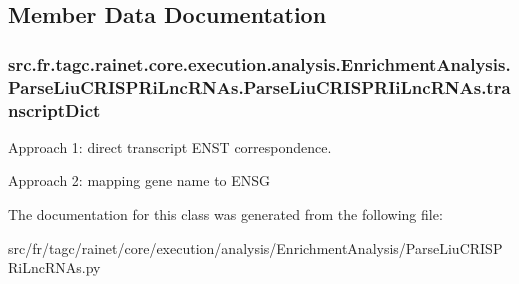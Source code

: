 \subsection{Member Data Documentation}
\hypertarget{classsrc_1_1fr_1_1tagc_1_1rainet_1_1core_1_1execution_1_1analysis_1_1EnrichmentAnalysis_1_1Parsee13b9e804847e1d3b2331cd039942e35_a77702ac784a00934adc3beff93714f3e}{
\subsubsection[{transcript\-Dict}]{\setlength{\rightskip}{0pt plus 5cm}src.\-fr.\-tagc.\-rainet.\-core.\-execution.\-analysis.\-Enrichment\-Analysis.\-Parse\-Liu\-C\-R\-I\-S\-P\-Ri\-Lnc\-R\-N\-As.\-Parse\-Liu\-C\-R\-I\-S\-P\-R\-Ii\-Lnc\-R\-N\-As.\-transcript\-Dict}}\label{classsrc_1_1fr_1_1tagc_1_1rainet_1_1core_1_1execution_1_1analysis_1_1EnrichmentAnalysis_1_1Parsee13b9e804847e1d3b2331cd039942e35_a77702ac784a00934adc3beff93714f3e}


Approach 1\-: direct transcript E\-N\-S\-T correspondence. 

Approach 2\-: mapping gene name to E\-N\-S\-G 

The documentation for this class was generated from the following file\-:\begin{DoxyCompactItemize}
\item 
src/fr/tagc/rainet/core/execution/analysis/\-Enrichment\-Analysis/Parse\-Liu\-C\-R\-I\-S\-P\-Ri\-Lnc\-R\-N\-As.\-py\end{DoxyCompactItemize}
